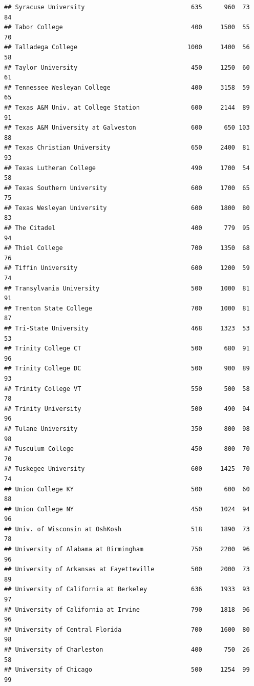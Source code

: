 \documentclass[
]{article}
\begin{document}
\begin{verbatim}
## Syracuse University                             635      960  73       84
## Tabor College                                   400     1500  55       70
## Talladega College                              1000     1400  56       58
## Taylor University                               450     1250  60       61
## Tennessee Wesleyan College                      400     3158  59       65
## Texas A&M Univ. at College Station              600     2144  89       91
## Texas A&M University at Galveston               600      650 103       88
## Texas Christian University                      650     2400  81       93
## Texas Lutheran College                          490     1700  54       58
## Texas Southern University                       600     1700  65       75
## Texas Wesleyan University                       600     1800  80       83
## The Citadel                                     400      779  95       94
## Thiel College                                   700     1350  68       76
## Tiffin University                               600     1200  59       74
## Transylvania University                         500     1000  81       91
## Trenton State College                           700     1000  81       87
## Tri-State University                            468     1323  53       53
## Trinity College CT                              500      680  91       96
## Trinity College DC                              500      900  89       93
## Trinity College VT                              550      500  58       78
## Trinity University                              500      490  94       96
## Tulane University                               350      800  98       98
## Tusculum College                                450      800  70       70
## Tuskegee University                             600     1425  70       74
## Union College KY                                500      600  60       88
## Union College NY                                450     1024  94       96
## Univ. of Wisconsin at OshKosh                   518     1890  73       78
## University of Alabama at Birmingham             750     2200  96       96
## University of Arkansas at Fayetteville          500     2000  73       89
## University of California at Berkeley            636     1933  93       97
## University of California at Irvine              790     1818  96       96
## University of Central Florida                   700     1600  80       98
## University of Charleston                        400      750  26       58
## University of Chicago                           500     1254  99       99

\end{verbatim}
\end{document}
